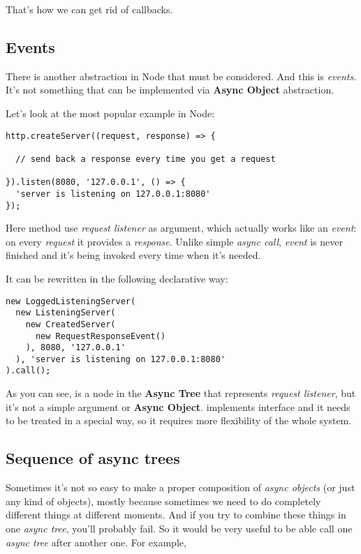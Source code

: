 \documentclass{article}
\newcommand{\cit}[1]{{\fontfamily{qcr}\selectfont{\textit{\textbf{\textcolor{darkgray}{#1}}}}}}
\begin{document}
That's how we can get rid of callbacks.

\subsection{Events}

There is another abstraction in Node that must be considered. And this is \textit{events}. It's not something that can be implemented via \textbf{Async Object} abstraction.

Let's look at the most popular example in Node:

\begin{lstlisting}
http.createServer((request, response) => {

  // send back a response every time you get a request

}).listen(8080, '127.0.0.1', () => {
  'server is listening on 127.0.0.1:8080'
});
\end{lstlisting}

Here method \cit{createServer} use \textit{request listener} as argument, which actually works like an \textit{event}: on every \textit{request} it provides a  \textit{response}. Unlike simple \textit{async call}, \textit{event} is never finished and it's being invoked every time when it's needed.

It can be rewritten in the following declarative way:

\begin{lstlisting}
new LoggedListeningServer(
  new ListeningServer(
    new CreatedServer(
      new RequestResponseEvent()
    ), 8080, '127.0.0.1'
  ), 'server is listening on 127.0.0.1:8080'
).call();
\end{lstlisting}

As you can see, \cit{RequestResponseEvent} is a node in the \textbf{Async Tree} that represents \textit{request listener}, but it's not a simple argument or \textbf{Async Object}. \cit{RequestResponseEvent} implements \cit{Event} interface and it needs to be treated in a special way, so it requires more flexibility of the whole system.

\subsection{Sequence of async trees}

Sometimes it's not so easy to make a proper composition of \textit{async objects} (or just any kind of objects), mostly because sometimes we need to do completely different things at different moments. And if you try to combine these things in one \textit{async tree}, you'll probably fail. So it would be very useful to be able call one \textit{async tree} after another one. For example,
\end{document}
